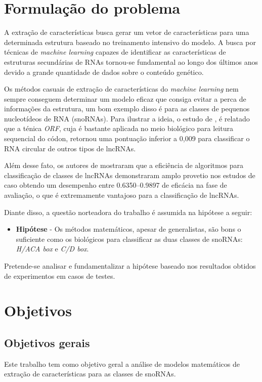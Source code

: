 \section{Formulação do problema}

A extração de características busca gerar um vetor de características para uma determinada estrutura baseado no treinamento intensivo do modelo. A busca por técnicas de \textit{machine learning} capazes de identificar as características de estruturas secundárias de RNAs tornou-se fundamental ao longo dos últimos anos devido a grande quantidade de dados sobre o conteúdo genético. 

Os métodos casuais de extração de características do \textit{machine learning} nem sempre conseguem determinar um modelo eficaz que consiga evitar a perca de informações da estrutura, um bom exemplo disso é para as classes de pequenos nucleotídeos de RNA (snoRNAs). Para ilustrar a ideia, o estudo de \cite{math-feature-bio}, é relatado que a ténica \textit{ORF}, cuja é bastante aplicada no meio biológico para leitura sequencial do códon, retornou uma pontuação inferior a 0,009 para classificar o RNA circular de outros tipos de lncRNAs.

Além desse fato, os autores de \cite{math-features-package} mostraram que a eficiência de algoritmos para classificação de classes de lncRNAs demonstraram amplo provetio nos estudos de caso obtendo um desempenho entre 0.6350–0.9897 de eficácia na fase de avaliação, o que é extremamente vantajoso para a classificação de lncRNAs.

Diante disso, a questão norteadora do trabalho é assumida na hipótese a seguir:

\begin{itemize}
    \item \textbf{Hipótese} - Os métodos matemáticos, apesar de generalistas, são bons o suficiente como os biológicos para classificar as duas classes de snoRNAs: \textit{H/ACA box} e \textit{C/D box}.  
\end{itemize}

Pretende-se analisar e fundamentalizar a hipótese baseado nos resultados obtidos de experimentos em casos de testes. 

\section{Objetivos}
\subsection{Objetivos gerais}
    Este trabalho tem como objetivo geral a análise de modelos matemáticos de extração de características para as classes de snoRNAs.
    

